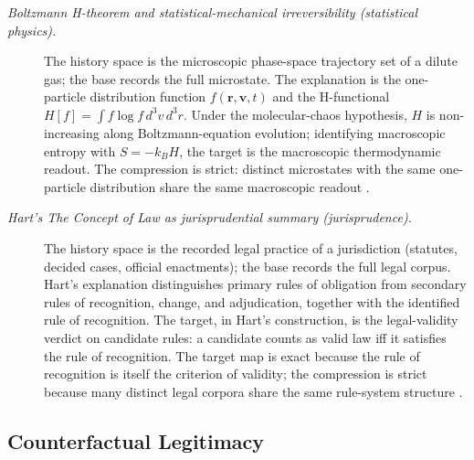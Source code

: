 \documentclass[11pt]{article}
\theoremstyle{definition}
\begin{document}
\begin{description}
\item[\emph{Boltzmann {H}-theorem and
statistical-mechanical irreversibility (statistical
physics).}]
The history space is the microscopic phase-space
trajectory set of a dilute gas; the base records the
full microstate.  The explanation is the one-particle
distribution function \(f(\mathbf r,\mathbf v,t)\) and
the H-functional
\(H[f]=\int f\log f\,d^3v\,d^3r\).  Under the
molecular-chaos hypothesis, \(H\) is non-increasing
along Boltzmann-equation evolution; identifying
macroscopic entropy with \(S=-k_B H\), the target is
the macroscopic thermodynamic readout.  The
compression is strict: distinct microstates with the
same one-particle distribution share the same
macroscopic readout \citep{Boltzmann1872Weitere}.

\item[\emph{Hart's \emph{The Concept of Law} as
jurisprudential summary (jurisprudence).}]
The history space is the recorded legal practice of a
jurisdiction (statutes, decided cases, official
enactments); the base records the full legal corpus.
Hart's explanation distinguishes primary rules of
obligation from secondary rules of recognition,
change, and adjudication, together with the
identified rule of recognition.  The target, in
Hart's construction, is the legal-validity verdict on
candidate rules: a candidate counts as valid law iff
it satisfies the rule of recognition.  The target map
is exact because the rule of recognition is itself
the criterion of validity; the compression is strict
because many distinct legal corpora share the same
rule-system structure \citep{Hart1961Concept}.
\end{description}

\subsection{Counterfactual Legitimacy}\label{sec:status-records-coherence:counterfactual}
\end{document}
